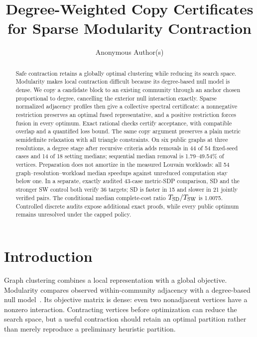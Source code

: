 \documentclass[sigconf,anonymous,review]{acmart}
\title{Degree-Weighted Copy Certificates for Sparse Modularity Contraction}
\author{Anonymous Author(s)}
\newcommand{\1}{\mathbf{1}}
\begin{document}
\begin{abstract}
Safe contraction retains a globally optimal clustering while reducing its
search space. Modularity makes local contraction difficult because its
degree-based null model is dense. We copy a candidate block to an existing
community through an anchor chosen proportional to degree, cancelling the
exterior null interaction exactly. Sparse normalized adjacency profiles then
give a collective spectral certificate: a nonnegative restriction preserves
an optimal fused representative, and a positive restriction forces fusion in
every optimum. Exact rational checks certify acceptance, with compatible
overlap and a quantified loss bound. The same copy argument preserves a plain
metric semidefinite relaxation with all triangle constraints. On six public
graphs at three resolutions, a degree stage after recursive criteria adds
removals in 44 of 54 fixed-seed cases and 14 of 18 setting medians; sequential
median removal is 1.79--49.54\% of vertices. Preparation does not amortize in
the measured Louvain workloads: all 54 graph--resolution--workload median
speedups against unreduced computation stay below one. In a separate, exactly
audited 43-case metric-SDP comparison, SD and the stronger SW control both
verify 36 targets; SD is faster in 15 and slower in 21 jointly verified pairs.
The conditional median complete-cost ratio $T_{\rm SD}/T_{\rm SW}$ is 1.0075.
Controlled discrete audits expose additional exact proofs, while every public
optimum remains unresolved under the capped policy.
\end{abstract}
\maketitle

\section{Introduction}
Graph clustering combines a local representation with a global objective.
Modularity compares observed within-community adjacency with a degree-based
null model~\cite{newman2006modularity,reichardt2006statistical}. Its objective matrix is dense: even two nonadjacent vertices have a
nonzero interaction. Contracting vertices before optimization can reduce the
search space, but a useful contraction should retain an optimal partition
rather than merely reproduce a preliminary heuristic partition.
\end{document}
